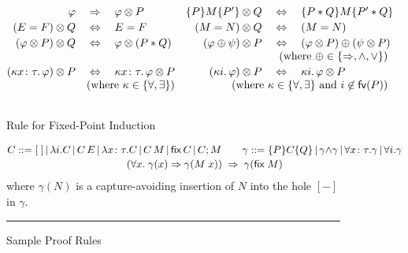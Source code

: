 \documentclass{LMCS}
\newcommand{\fix}{\mathsf{fix}}
\newcommand{\FV}{\mathsf{fv}}
\newcommand{\mtri}[3]{\{{#1}\}{#2}\{{#3}\}}
\begin{document}
\begin{figure*}[t]
$$
\begin{array}{@{}rclrcl@{}}
  \varphi & \;\Rightarrow\; & \varphi \otimes P
&
\mtri{P}{M}{P'} \otimes Q 
  & \;\Leftrightarrow\; &
  \mtri{P*Q}{M}{P'*Q} 
\\[0.5ex]
(E = F) \otimes Q 
  & \;\Leftrightarrow\; &
  E=F
&
(M = N) \otimes Q 
  & \;\Leftrightarrow\; &
  (M=N)
\\[0.5ex]
(\varphi \otimes P) \otimes Q 
  & \;\Leftrightarrow\; &
  \varphi \otimes (P*Q)
&
(\varphi \oplus \psi)\otimes P 
  & \;\Leftrightarrow\; &
  (\varphi \otimes P) \oplus (\psi \otimes P)
\\
&&&
\multicolumn{3}{r}{
  \qquad (\mbox{where } \oplus \in \{\Rightarrow, \wedge, \vee\})
}
\\[0.5ex]
(\kappa x\colon \tau.\, \varphi)\otimes P 
  & \;\Leftrightarrow\; &
  \kappa x\colon \tau.\, \varphi \otimes P
&
(\kappa i.\, \varphi)\otimes P 
  & \;\Leftrightarrow\; &
  \kappa i.\, \varphi \otimes P
\\
\multicolumn{3}{r}{
  \qquad(\mbox{where } \kappa \in \{\forall,\exists\})
}
&
\multicolumn{3}{r}{
  \qquad(\mbox{where } \kappa \in \{\forall,\exists\} \mbox{ and } i \not\in \FV(P))
}
\\
\\
\end{array}
$$


\begin{center}
{\sc Rule for Fixed-Point Induction}
\end{center}

$$
\begin{array}{@{}c@{}}
C ::= [\;] 
   \,{\mid}\, \lambda i. C
   \,{\mid}\, C\, E 
   \,{\mid}\, \lambda x\colon \tau. C
   \,{\mid}\, C\, M 
   \,{\mid}\, \fix\, C
   \,{\mid}\, C;M 
\qquad
\gamma ::= \mtri{P}{C}{Q}
  \,{\mid}\, \gamma {\wedge} \gamma 
  \,{\mid}\, \forall x\colon\tau. \gamma
  \,{\mid}\, \forall i. \gamma
\\[0.5ex]
(\forall x.\; \gamma(x) \Rightarrow \gamma(M\;x))
\;\Rightarrow\; 
\gamma(\fix\;M)
\end{array}
$$
where $\gamma(N)$ is a capture-avoiding insertion of $N$
into the hole $[-]$ in $\gamma$.
\vspace{1mm}
\hrule
\caption{Sample Proof Rules}
\label{fig:sl-rules}
\end{figure*}
\end{document}
